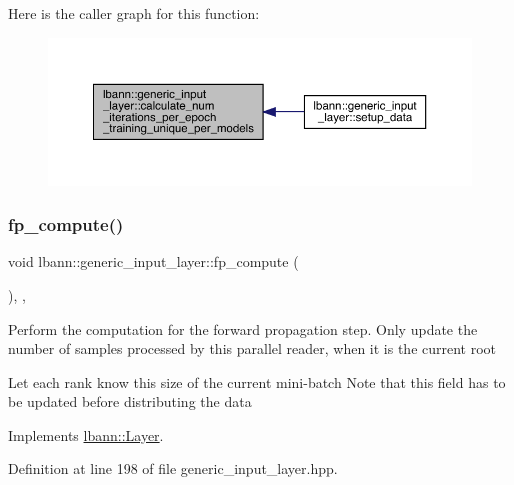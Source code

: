 Here is the caller graph for this function\+:\nopagebreak
\begin{figure}[H]
\begin{center}
\leavevmode
\includegraphics[width=350pt]{classlbann_1_1generic__input__layer_a0f09422a09e76da77ac42b3037173041_icgraph}
\end{center}
\end{figure}
\mbox{\label{classlbann_1_1generic__input__layer_ae74c8c5a7e14b4fdd4902554bbc7bcef}} 
\subsubsection{\texorpdfstring{fp\+\_\+compute()}{fp\_compute()}}
{\footnotesize\ttfamily void lbann\+::generic\+\_\+input\+\_\+layer\+::fp\+\_\+compute (\begin{DoxyParamCaption}{ }\end{DoxyParamCaption})\hspace{0.3cm}{\ttfamily [inline]}, {\ttfamily [override]}, {\ttfamily [virtual]}}

Perform the computation for the forward propagation step. Only update the number of samples processed by this parallel reader, when it is the current root

Let each rank know this size of the current mini-\/batch Note that this field has to be updated before distributing the data 

Implements \hyperlink{classlbann_1_1Layer_a523319dd1bd87a0612afa1912bb5aad7}{lbann\+::\+Layer}.



Definition at line 198 of file generic\+\_\+input\+\_\+layer.\+hpp.


